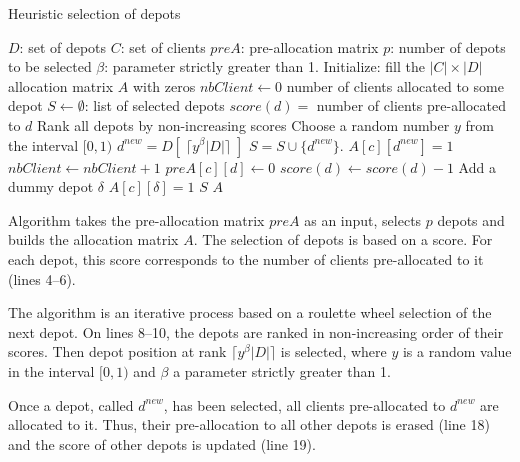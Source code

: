 \documentclass[10pt, a4paper]{article}
\begin{document}

\begin{algorithm}
	\caption{Heuristic selection of depots}
	\label{algo:location-sampling}
	\begin{algorithmic}[1]
		\REQUIRE $D$: set of depots
		\REQUIRE $C$: set of clients
		\REQUIRE $preA$: pre-allocation matrix
		\REQUIRE $p$: number of depots to be selected
		\REQUIRE $\beta$: parameter strictly greater than 1.
		\STATE Initialize: fill the $|C| \times |D|$ allocation matrix $A$ with zeros
		\STATE $nbClient \leftarrow 0$ number of clients allocated to some depot
		\STATE $S \leftarrow \emptyset$: list of selected depots
			\STATE $score(d) =$ number of clients pre-allocated to $d$
		\ENDFOR
			\STATE Rank all depots by non-increasing scores
			\STATE Choose a random number $y$ from the interval $[0,1)$
			\STATE $d^{new} = D[\;\lceil y^\beta |D| \rceil\;]$
			\STATE $ S = S \cup \{d^{new}\}$.
					\STATE $A[c][d^{new}] = 1$
					\STATE $nbClient \leftarrow nbClient +1$
						\STATE $preA[c][d] \leftarrow 0$
						\STATE $score(d) \leftarrow score(d)-1$
						\ENDIF
					\ENDFOR
				\ENDIF		
			\ENDFOR
		\ENDWHILE
			\STATE Add a dummy depot $\delta$
				\STATE $A[c][\delta]=1$
			\ENDFOR
		\ENDIF
		\RETURN $S$
		\RETURN $A$
	\end{algorithmic}
\end{algorithm}

Algorithm \label{algo:location-sampling} takes the pre-allocation matrix $preA$
as an input, selects $p$ depots and builds the allocation matrix $A$.
The selection of depots is based on a score. 
For each depot, this score corresponds to the number of clients pre-allocated to it (lines 4--6). 

The algorithm is an iterative process based on a roulette wheel selection of the next depot. On lines 8--10, the depots are ranked in non-increasing order of their scores. Then depot position at rank  $\lceil y^\beta |D| \rceil$ is selected, where $y$ is a random value in the interval $[0,1)$ and $\beta$ a parameter strictly greater than 1. 

Once a depot, called $d^{new}$, has been selected, all clients pre-allocated to $d^{new}$ are allocated to it. Thus, their pre-allocation to all other depots is erased (line 18) and the score of other depots is updated (line 19). 
\end{document}
